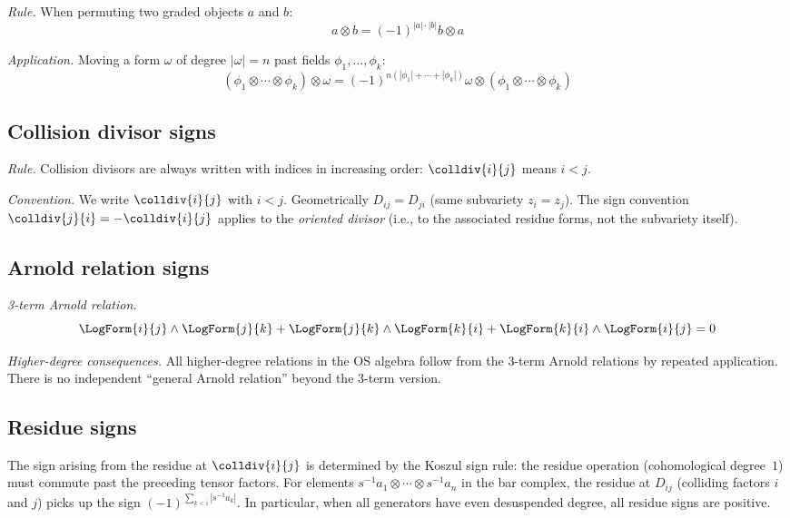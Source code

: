 \emph{Rule.} When permuting two graded objects $a$ and $b$:
\[a \otimes b = (-1)^{|a| \cdot |b|} b \otimes a\]

\emph{Application.} Moving a form $\omega$ of degree $|\omega| = n$ past fields $\phi_1, \ldots, \phi_k$:
\[(\phi_1 \otimes \cdots \otimes \phi_k) \otimes \omega = (-1)^{n(|\phi_1| + \cdots + |\phi_k|)} \omega \otimes (\phi_1 \otimes \cdots \otimes \phi_k)\]

\subsection{Collision divisor signs}

\emph{Rule.} Collision divisors are always written with indices in increasing order: $\colldiv{i}{j}$ means $i < j$.

\emph{Convention.} We write $\colldiv{i}{j}$ with $i < j$.  Geometrically $D_{ij} = D_{ji}$ (same subvariety $z_i = z_j$).  The sign convention $\colldiv{j}{i} = -\colldiv{i}{j}$ applies to the \emph{oriented divisor} (i.e., to the associated residue forms, not the subvariety itself).

\subsection{Arnold relation signs}

\emph{3-term Arnold relation.}
\[\LogForm{i}{j} \wedge \LogForm{j}{k} + \LogForm{j}{k} \wedge \LogForm{k}{i} + \LogForm{k}{i} \wedge \LogForm{i}{j} = 0\]

\emph{Higher-degree consequences.}
All higher-degree relations in the OS algebra follow from the 3-term Arnold relations by repeated application. There is no independent ``general Arnold relation'' beyond the 3-term version.

\subsection{Residue signs}

The sign arising from the residue at $\colldiv{i}{j}$ is determined by the Koszul sign rule: the residue operation (cohomological degree~$1$) must commute past the preceding tensor factors.  For elements $s^{-1}a_1 \otimes \cdots \otimes s^{-1}a_n$ in the bar complex, the residue at $D_{ij}$ (colliding factors $i$ and $j$) picks up the sign $(-1)^{\sum_{k<i}|s^{-1}a_k|}$.  In particular, when all generators have even desuspended degree, all residue signs are positive.

